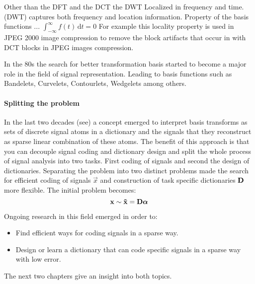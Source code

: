 Other than the DFT and the DCT the DWT
Localized in frequency and time. 
(DWT) captures both frequency and location information. 
 Property of the basis functions ...
$\int_{-\infty}^{\infty} \! f(t) \, \mathrm{d}t = 0$
For example this locality property is used in JPEG 2000 image compression to
remove the block artifacts that occur in with DCT blocks in JPEG images
compression. 

In the 80s the search for better transformation basis started to become a major
role in the field of signal representation. Leading to basis functions such as
Bandelets, Curvelets, Contourlets, Wedgelets among others.

\paragraph{Splitting the problem}
\cite{Rubinstein2010}
In the last two decades (see\cite{Olshausen1996,Mallat1993}) a concept emerged
to interpret basis transforms as sets of discrete signal atoms in a dictionary
and the signals that they reconstruct as sparse linear combination of these
atoms. The benefit of this approach is that you can decouple signal coding and
dictionary design and split the whole process of signal analysis into two tasks.
First coding of signals and second the design of dictionaries. Separating the
problem into two distinct problems made the search for efficient coding of
signals $\vec{x}$ and construction of task specific dictionaries $\boldsymbol{\mathrm{D}}$ more
flexible. The initial problem becomes:
\begin{equation}
 \boldsymbol{\mathrm{x}} \sim \boldsymbol{\mathrm{\tilde{x}}}  = \boldsymbol{\mathrm{D}}\boldsymbol{\mathrm{\alpha}}
\end{equation}

Ongoing research in this field emerged in order to:
\begin{itemize}
 \item Find efficient ways for coding signals in a sparse way.
 \item Design or learn a dictionary that can code specific signals in
a sparse way with low error.
\end{itemize}
The next two chapters give an insight into both topics. 



